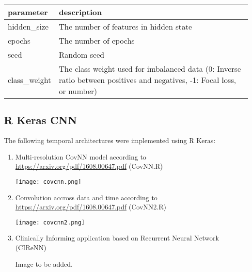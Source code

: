 \documentclass[]{article}
\begin{document}
\begin{longtable}[]{@{}ll@{}}
\toprule
\begin{minipage}[b]{0.14\columnwidth}\raggedright\strut
parameter\strut
\end{minipage} & \begin{minipage}[b]{0.35\columnwidth}\raggedright\strut
description\strut
\end{minipage}\tabularnewline
\midrule
\endhead
\begin{minipage}[t]{0.14\columnwidth}\raggedright\strut
hidden\_size\strut
\end{minipage} & \begin{minipage}[t]{0.35\columnwidth}\raggedright\strut
The number of features in hidden state\strut
\end{minipage}\tabularnewline
\begin{minipage}[t]{0.14\columnwidth}\raggedright\strut
epochs\strut
\end{minipage} & \begin{minipage}[t]{0.35\columnwidth}\raggedright\strut
The number of epochs\strut
\end{minipage}\tabularnewline
\begin{minipage}[t]{0.14\columnwidth}\raggedright\strut
seed\strut
\end{minipage} & \begin{minipage}[t]{0.35\columnwidth}\raggedright\strut
Random seed\strut
\end{minipage}\tabularnewline
\begin{minipage}[t]{0.14\columnwidth}\raggedright\strut
class\_weight\strut
\end{minipage} & \begin{minipage}[t]{0.35\columnwidth}\raggedright\strut
The class weight used for imbalanced data (0: Inverse ratio between
positives and negatives, -1: Focal loss, or number)\strut
\end{minipage}\tabularnewline
\bottomrule
\end{longtable}

\subsection{R Keras CNN}\label{r-keras-cnn}

The following temporal architectures were implemented using R Keras:

\begin{enumerate}
\def\labelenumi{\arabic{enumi}.}
\item
  Multi-resolution CovNN model according to
  \url{https://arxiv.org/pdf/1608.00647.pdf} (CovNN.R)

  \texttt{[image: covcnn.png]}
\item
  Convolution accross data and time according to
  \url{https://arxiv.org/pdf/1608.00647.pdf} (CovNN2.R)

  \texttt{[image: covcnn2.png]}
\item
  Clinically Informing application based on Recurrent Neural Network
  (CIReNN)

  Image to be added.
\end{enumerate}
\end{document}
